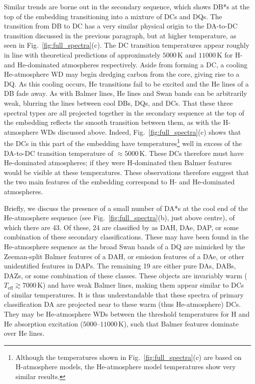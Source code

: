 \documentclass[fleqn,usenatbib]{mnras}
\def\Teff{T_\mathrm{eff}}
\begin{document}
Similar trends are borne out in the secondary sequence, which shows DB*s at the top of the embedding transitioning into a mixture of DCs and DQs.
The transition from DB to DC has a very similar physical origin to the DA-to-DC transition discussed in the previous paragraph, but at higher temperature, as seen in Fig.~\ref{fig:full_spectra}(c).
The DC transition temperatures appear roughly in line with theoretical predictions of approximately $5000\,\text{K}$ and $11000\,\text{K}$ for H- and He-dominated atmospheres respectively.
Aside from forming a DC, a cooling He-atmosphere WD may begin dredging carbon from the core, giving rise to a DQ.
As this cooling occurs, He transitions fail to be excited and the He lines of a DB fade away.
As with Balmer lines, He lines and Swan bands can be arbitrarily weak, blurring the lines between cool DBs, DQs, and DCs.
That these three spectral types are all projected together in the secondary sequence at the top of the embedding reflects the smooth transition between them, as with the H-atmosphere WDs discussed above.
Indeed, Fig.~\ref{fig:full_spectra}(c) shows that the DCs in this part of the embedding have temperatures\footnote{
    Although the temperatures shown in Fig.~\ref{fig:full_spectra}(c) are based on H-atmosphere models, the He-atmosphere model temperatures show very similar results.
} well in excess of the DA-to-DC transition temperature of $\approx 5000\,\text{K}$.
These DCs therefore must have He-dominated atmospheres; if they were H-dominated then Balmer features would be visible at these temperatures.
These observations therefore suggest that the two main features of the embedding correspond to H- and He-dominated atmospheres.

Briefly, we discuss the presence of a small number of DA*s at the cool end of the He-atmosphere sequence (see Fig.~\ref{fig:full_spectra}(b), just above centre), of which there are 43.
Of these, 24 are classified by \citet{manser24} as DAH, DAe, DAP, or some combination of these secondary classifications.
These may have been found in the He-atmosphere sequence as the broad Swan bands of a DQ are mimicked by the Zeeman-split Balmer features of a DAH, or emission features of a DAe, or other unidentified features in DAPs.
The remaining 19 are either pure DAs, DABs, DAZs, or some combination of these classes.
These objects are invariably warm ($\Teff \gtrsim 7000\,\text{K}$) and have weak Balmer lines, making them appear similar to DCs of similar temperatures.
It is thus understandable that these spectra of primary classification DA are projected near to these warm (thus He-atmosphere) DCs.
They may be He-atmosphere WDs between the threshold temperatures for H and He absorption excitation ($5000$--$11000\,\text{K}$), such that Balmer features dominate over He lines.
\end{document}

